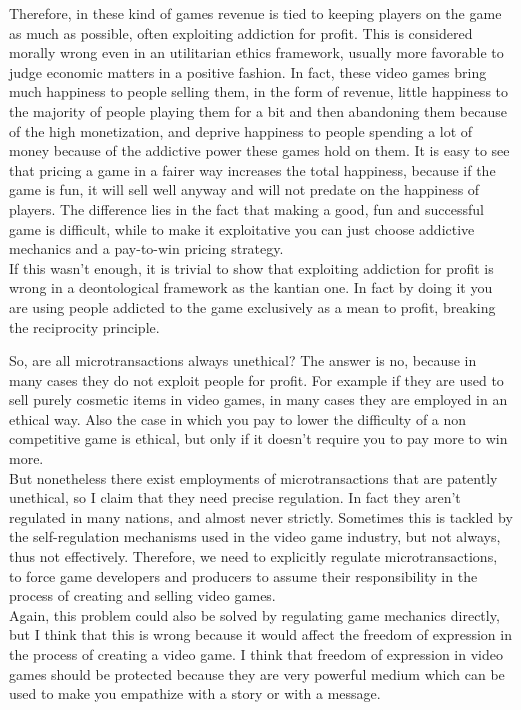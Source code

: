\documentclass[10pt,a4paper]{article}
\begin{document}
Therefore, in these kind of games revenue is tied to keeping players on the game as much as possible, often exploiting addiction for profit.
This is considered morally wrong even in an utilitarian ethics framework, usually more favorable to judge economic matters in a positive fashion. 
In fact, these video games bring much happiness to people selling them, in the form of revenue, little happiness to the majority of people playing them for a bit and then abandoning them because of the high monetization, and deprive happiness to people spending a lot of money because of the addictive power these games hold on them.
It is easy to see that pricing a game in a fairer way increases the total happiness, because if the game is fun, it will sell well anyway and will not predate on the happiness of players.
The difference lies in the fact that making a good, fun and successful game is difficult, while to make it exploitative you can just choose addictive mechanics and a pay-to-win pricing strategy.\\
If this wasn't enough, it is trivial to show that exploiting addiction for profit is wrong in a deontological framework as the kantian one.
In fact by doing it you are using people addicted to the game exclusively as a mean to profit, breaking the reciprocity principle.

So, are all microtransactions always unethical?
The answer is no, because in many cases they do not exploit people for profit.
For example if they are used to sell purely cosmetic items in video games, in many cases they are employed in an ethical way.
Also the case in which you pay to lower the difficulty of a non competitive game is ethical, but only if it doesn't require you to pay more to win more.\\
But nonetheless there exist employments of microtransactions that are patently unethical, so I claim that they need precise regulation.
In fact they aren't regulated in many nations, and almost never strictly.
Sometimes this is tackled by the self-regulation mechanisms used in the video game industry, but not always, thus not effectively.
Therefore, we need to explicitly regulate microtransactions, to force game developers and producers to assume their responsibility in the process of creating and selling video games.\\
Again, this problem could also be solved by regulating game mechanics directly, but I think that this is wrong because it would affect the freedom of expression in the process of creating a video game.
I think that freedom of expression in video games should be protected because they are very powerful medium which can be used to make you empathize with a story or with a message.
\end{document}
